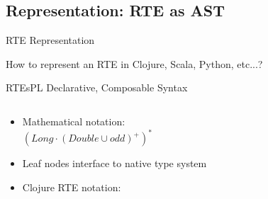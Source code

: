 \subsection{Representation: RTE as AST}


{  %
\begin{frame}{ RTE Representation}

  How to represent an RTE in Clojure, Scala, Python, etc...?


  \medskip
  
\end{frame}
}


\begin{frame}[t]{RTEs}{PL Declarative, Composable Syntax}
  \begin{columns}
    \begin{column}{0.55\textwidth}
  \begin{itemize}
  \item Mathematical notation:\\
  \quad\textcolor{greeny}{$(Long \cdot (Double \cup odd)^+)^*$}

  \item Leaf nodes interface to native type system

  \item  Clojure RTE notation:\\
    \usebox\exnoteboxclojure %
  \end{itemize}
    \end{column}%
    \begin{column}{0.45\textwidth}
      \scalebox{0.7}{}
    \end{column}%
  \end{columns}%
\end{frame}

